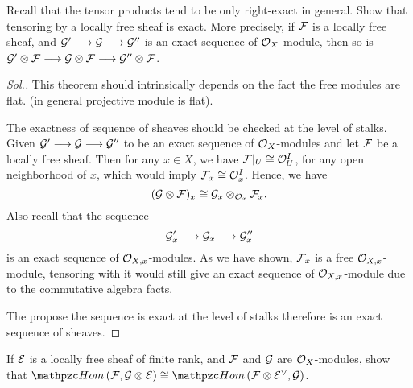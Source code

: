 \documentclass[11pt]{book} %
\begin{document}
\begin{exr}
Recall that the tensor products tend to be only right-exact in general. Show that tensoring by a locally free sheaf is exact. More precisely, if ${\cal F}$ is a locally free sheaf, and ${\cal G}'\longrightarrow {\cal G}\longrightarrow {\cal G}''$ is an exact sequence of ${\cal O}_X$-module, then so is ${\cal G}'\otimes {\cal F}\longrightarrow {\cal G}\otimes {\cal F}\longrightarrow{\cal G}''\otimes {\cal F}$.
\end{exr}
\begin{proof}[Sol.]
This theorem should intrinsically depends on the fact the free modules are flat. (in general projective module is flat).

The exactness of sequence of sheaves should be checked at the level of stalks. Given ${\cal G}'\longrightarrow{\cal G}\longrightarrow {\cal G}''$ to be an exact sequence of ${\cal O}_X$-modules and let ${\cal F}$ be a locally free sheaf. Then for any $x\in X$, we have ${\cal F}|_U\cong {\cal O}_U^{I}$, for any open neighborhood of $x$, which would imply ${\cal F}_x\cong {\cal O}_x^{I}$. Hence, we have
$$
({\cal G}\otimes{\cal F})_x\cong {\cal G}_x\otimes_{{\cal O}_x}{\cal F}_x.
$$
Also recall that the sequence 
$$
{\cal G}_x'\longrightarrow{\cal G}_x\longrightarrow{\cal G}''_x
$$
is an exact sequence of ${\cal O}_{X,x}$-modules. As we have shown, ${\cal F}_x$ is a free ${\cal O}_{X,x}$-module, tensoring with it would still give an exact sequence of ${\cal O}_{X,x}$-module due to the commutative algebra facts.

The propose the sequence is exact at the level of stalks therefore is an exact sequence of sheaves.
\end{proof}
\begin{exr}
If ${\cal E}$ is a locally free sheaf of finite rank, and ${\cal F}$ and ${\cal G}$ are ${\cal O}_X$-modules, show that $\phom(\calf,\calg\otimes\cale)\cong \phom(\calf\otimes \cale^\vee,\calg)$.
\end{exr}
\end{document}
